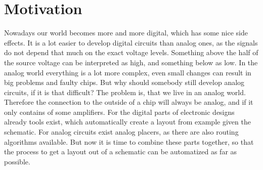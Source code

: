 \chapter{Motivation}

Nowadays our world becomes more and more digital, which has some nice side effects. It is a lot easier to develop digital circuits than analog ones, as the signals do not depend that much on the exact voltage levels. Something above the half of the source voltage can be interpreted as high, and something below as low. In the analog world everything is a lot more complex, even small changes can result in big problems and faulty chips. But why should somebody still develop analog circuits, if it is that difficult? The problem is, that we live in an analog world. Therefore the connection to the outside of a chip will always be analog, and if it only contains of some amplifiers. For the digital parts of electronic designs already tools exist, which automatically create a layout from example given the schematic. For analog circuits exist analog placers, as there are also routing algorithms available. But now it is time to combine these parts together, so that the process to get a layout out of a schematic can be automatized as far as possible.